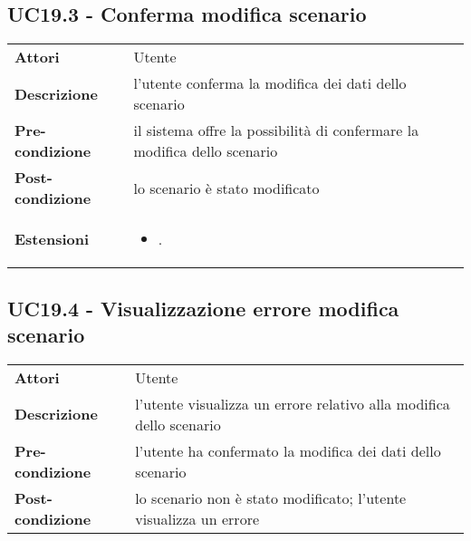 \subsection{UC19.3 - Conferma modifica scenario}
\label{sssec:UC19.3}
\def\arraystretch{1.5}
\begin{tabularx}{\textwidth}{l|p{}}
\rowcolor{I} \multicolumn{2}{c}{\color{white}\textbf{UC19.3 - Conferma modifica scenario}} \\
\toprule
\endhead
\textbf{Attori} & Utente\\
\textbf{Descrizione} & l'utente conferma la modifica dei dati dello scenario\\
\textbf{Pre-condizione} & il sistema offre la possibilità di confermare la modifica dello scenario\\
\textbf{Post-condizione} & lo scenario è stato modificato\\
\textbf{Estensioni} & \vspace{-1.2em}\begin{itemize}[leftmargin=*,noitemsep,nosep]
\item \nameref{sssec:UC19.4}.
\end{itemize}\\
\bottomrule
\end{tabularx}
\subsection{UC19.4 - Visualizzazione errore modifica scenario}
\label{sssec:UC19.4}
\def\arraystretch{1.5}
\begin{tabularx}{\textwidth}{l|p{}}
\rowcolor{I} \multicolumn{2}{c}{\color{white}\textbf{UC19.4 - Visualizzazione errore modifica scenario}} \\
\toprule
\endhead
\textbf{Attori} & Utente\\
\textbf{Descrizione} & l'utente visualizza un errore relativo alla modifica dello scenario\\
\textbf{Pre-condizione} & l'utente ha confermato la modifica dei dati dello scenario\\
\textbf{Post-condizione} & lo scenario non è stato modificato; l'utente visualizza un errore\\
\bottomrule
\end{tabularx}
